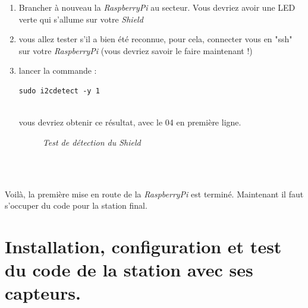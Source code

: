 \begin{enumerate}
		\item Brancher à nouveau la \textit{RaspberryPi} au secteur. Vous devriez avoir une LED verte qui s'allume sur votre \textit{Shield}
		\item vous allez tester s'il a bien été reconnue, pour cela, connecter vous en "ssh" sur votre \textit{RaspberryPi} (vous devriez savoir le faire maintenant !)
		\item lancer la commande :
		\begin{lstlisting}[style=MyBashStyle]
	sudo i2cdetect -y 1
		\end{lstlisting}\\
	
vous devriez obtenir ce résultat, avec le 04 en première ligne.\\

\begin{figure}[H]
\begin{center}
\end{center}
	\caption{ \textit{Test de détection du Shield}}
\end{figure}\\

\end{enumerate}\\

Voilà, la première mise en route de la \textit{RaspberryPi} est terminé. Maintenant il faut s'occuper du code pour la station final.

\newpage
\section{Installation, configuration et test du code de la station avec ses capteurs.}\\

